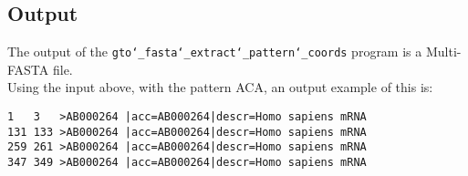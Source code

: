 \subsection*{Output}
The output of the \texttt{gto\char`_fasta\char`_extract\char`_pattern\char`_coords} program is a Multi-FASTA file.\\
Using the input above, with the pattern ACA, an output example of this is:
\begin{lstlisting}
1	3	>AB000264 |acc=AB000264|descr=Homo sapiens mRNA 
131	133	>AB000264 |acc=AB000264|descr=Homo sapiens mRNA 
259	261	>AB000264 |acc=AB000264|descr=Homo sapiens mRNA 
347	349	>AB000264 |acc=AB000264|descr=Homo sapiens mRNA  
\end{lstlisting}
